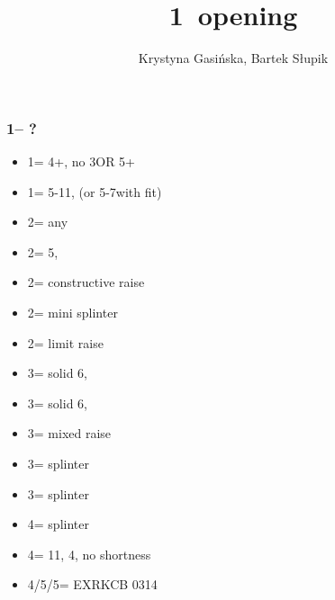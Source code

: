 \documentclass[12pt, a4paper]{article}
\title{1\major\ opening}
\author{Krystyna Gasińska, Bartek Słupik}
\begin{document}
\maketitle


\subsubsection*{1\hearts -- ?}
\begin{itemize}
    \item 1\spades = 4+\spades, no 3\hearts OR 5\hearts + \gf
    \item 1\nt = 5-11\hcp, (or 5-7\hcp with \hearts fit)
    \item 2\clubs = any \gf
    \item 2\diams = 5\diams, \gf
    \item 2\hearts = constructive raise
    \item 2\spades = mini splinter
    \item 2\nt = limit raise
    \item 3\clubs = solid 6\clubs, \inv
    \item 3\diams = solid 6\diams, \inv
    \item 3\hearts = mixed raise
    \item 3\spades = splinter \spades
    \item 3\nt = splinter \diams
    \item 4\clubs = splinter \clubs
    \item 4\diams = 11\hcp, 4\hearts, no shortness
    \item 4\spades/5\clubs/5\diams = EXRKCB 0314
\end{itemize}
\end{document}
